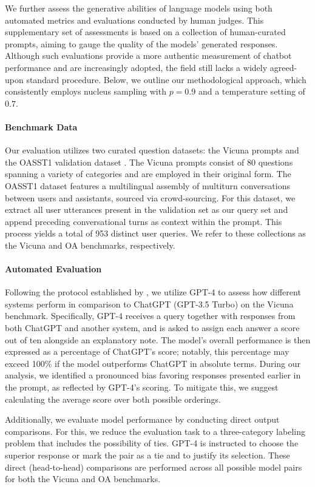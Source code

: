 We further assess the generative abilities of language models using both automated metrics and evaluations conducted by human judges. This supplementary set of assessments is based on a collection of human-curated prompts, aiming to gauge the quality of the models' generated responses. Although such evaluations provide a more authentic measurement of chatbot performance and are increasingly adopted, the field still lacks a widely agreed-upon standard procedure. Below, we outline our methodological approach, which consistently employs nucleus sampling with $p=0.9$ and a temperature setting of $0.7$.

\paragraph{Benchmark Data} Our evaluation utilizes two curated question datasets: the Vicuna prompts \citep{vicuna2023} and the OASST1 validation dataset \citep{kopf2023openassistant}. The Vicuna prompts consist of 80 questions spanning a variety of categories and are employed in their original form. The OASST1 dataset features a multilingual assembly of multiturn conversations between users and assistants, sourced via crowd-sourcing. For this dataset, we extract all user utterances present in the validation set as our query set and append preceding conversational turns as context within the prompt. This process yields a total of 953 distinct user queries. We refer to these collections as the Vicuna and OA benchmarks, respectively.

\paragraph{Automated Evaluation} Following the protocol established by \citet{vicuna2023}, we utilize GPT-4 to assess how different systems perform in comparison to ChatGPT (GPT-3.5 Turbo) on the Vicuna benchmark. Specifically, GPT-4 receives a query together with responses from both ChatGPT and another system, and is asked to assign each answer a score out of ten alongside an explanatory note. The model’s overall performance is then expressed as a percentage of ChatGPT’s score; notably, this percentage may exceed 100\% if the model outperforms ChatGPT in absolute terms. During our analysis, we identified a pronounced bias favoring responses presented earlier in the prompt, as reflected by GPT-4’s scoring. To mitigate this, we suggest calculating the average score over both possible orderings.

Additionally, we evaluate model performance by conducting direct output comparisons. For this, we reduce the evaluation task to a three-category labeling problem that includes the possibility of ties. GPT-4 is instructed to choose the superior response or mark the pair as a tie and to justify its selection. These direct (head-to-head) comparisons are performed across all possible model pairs for both the Vicuna and OA benchmarks.

